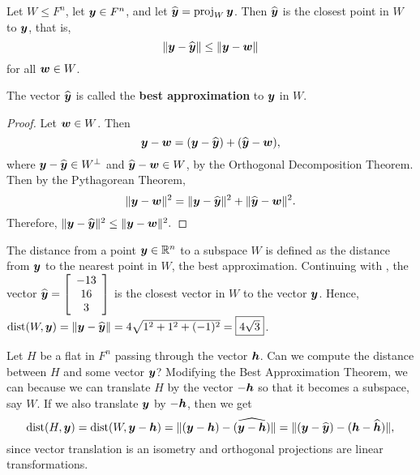 \begin{Thm}\label{thm:bestapprox} Let $W \le F^n$, let $\bb y \in F^n$, and let $\widehat{\bb y} = \proj_W \bb y$. Then $\widehat{\bb y}$ is the closest point in $W$ to $\bb y$, that is, 
\[\Vert \bb y - \widehat{\bb y}\Vert \le \Vert \bb y - \bb w\Vert\] for all $\bb w \in W$.
\end{Thm}

The vector $\widehat{\bb y}$ is called the \textbf{best approximation} to $\bb y$ in $W$.\\

\begin{proof}
Let $\bb w\in W$. Then 
\[\bb y - \bb w = (\bb y - \widehat{\bb y}) + (\widehat{\bb y} - \bb w),\] where $\bb y - \widehat{\bb y} \in W^\perp$ and $\widehat{\bb y} - \bb w\in W$, by the Orthogonal Decomposition Theorem. Then by the Pythagorean Theorem, 
\[\Vert \bb y - \bb w\Vert^2 = \Vert \bb y - \widehat{\bb y}\Vert^2 + \Vert \widehat{\bb y} - \bb w\Vert^2.\] Therefore, $\Vert \bb y - \widehat{\bb y}\Vert^2 \le \Vert \bb y - \bb w\Vert^2.$
\end{proof}\vs

\begin{Exam} The distance from a point $\bb y \in \R^n$ to a subspace $W$ is defined as the distance from $\bb y$ to the nearest point in $W$, the best approximation. Continuing with , the vector $\widehat{\bb y} = \mtx{c}{-13\\16\\3}$ is the closest vector in $W$ to the vector $\bb y$. Hence, $\dist(W,\bb y) = \Vert \bb y - \widehat{\bb y}\Vert = 4\sqrt{1^2+1^2+(-1)^2} =  \fbox{$4\sqrt{3}$}$. 
\end{Exam}\vs

Let $H$ be a flat in $F^n$ passing through the vector $\bb h$. Can we compute the distance between $H$ and some vector $\bb y$? Modifying the Best Approximation Theorem, we can because we can translate $H$ by the vector $-\bb h$ so that it becomes a subspace, say $W$. If we also translate $\bb y$ by $-\bb h$, then we get 
\[\dist(H,\bb y) = \dist(W, \bb y - \bb h) = \Vert (\bb y-\bb h) - \widehat{(\bb y-\bb h)}\Vert = \Vert (\bb y - \widehat{\bb y}) - (\bb h - \widehat{\bb h})\Vert,\] since vector translation is an isometry and orthogonal projections are linear transformations. \\

